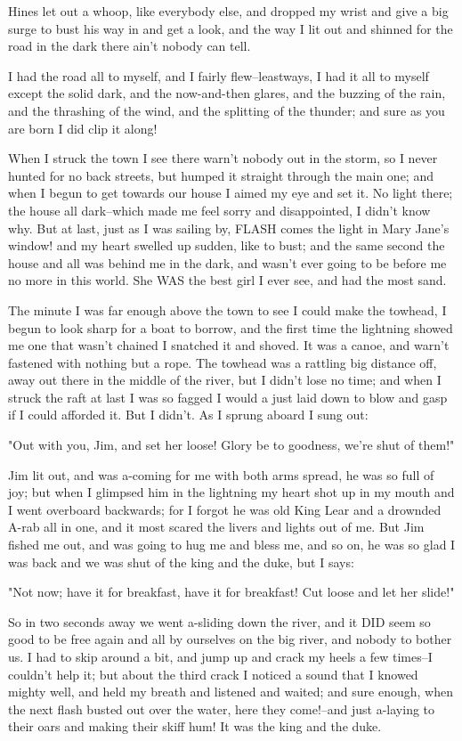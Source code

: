 Hines let out a whoop, like everybody else, and dropped my wrist and give
a big surge to bust his way in and get a look, and the way I lit out and
shinned for the road in the dark there ain't nobody can tell.

I had the road all to myself, and I fairly flew--leastways, I had it all
to myself except the solid dark, and the now-and-then glares, and the
buzzing of the rain, and the thrashing of the wind, and the splitting of
the thunder; and sure as you are born I did clip it along!

When I struck the town I see there warn't nobody out in the storm, so I
never hunted for no back streets, but humped it straight through the main
one; and when I begun to get towards our house I aimed my eye and set it.
No light there; the house all dark--which made me feel sorry and
disappointed, I didn't know why.  But at last, just as I was sailing by,
FLASH comes the light in Mary Jane's window! and my heart swelled up
sudden, like to bust; and the same second the house and all was behind me
in the dark, and wasn't ever going to be before me no more in this world.
She WAS the best girl I ever see, and had the most sand.

The minute I was far enough above the town to see I could make the
towhead, I begun to look sharp for a boat to borrow, and the first time
the lightning showed me one that wasn't chained I snatched it and shoved.
It was a canoe, and warn't fastened with nothing but a rope.  The towhead
was a rattling big distance off, away out there in the middle of the
river, but I didn't lose no time; and when I struck the raft at last I
was so fagged I would a just laid down to blow and gasp if I could
afforded it.  But I didn't.  As I sprung aboard I sung out:

"Out with you, Jim, and set her loose!  Glory be to goodness, we're shut
of them!"

Jim lit out, and was a-coming for me with both arms spread, he was so
full of joy; but when I glimpsed him in the lightning my heart shot up in
my mouth and I went overboard backwards; for I forgot he was old King
Lear and a drownded A-rab all in one, and it most scared the livers and
lights out of me.  But Jim fished me out, and was going to hug me and
bless me, and so on, he was so glad I was back and we was shut of the
king and the duke, but I says:

"Not now; have it for breakfast, have it for breakfast!  Cut loose and
let her slide!"

So in two seconds away we went a-sliding down the river, and it DID seem
so good to be free again and all by ourselves on the big river, and
nobody to bother us.  I had to skip around a bit, and jump up and crack
my heels a few times--I couldn't help it; but about the third crack I
noticed a sound that I knowed mighty well, and held my breath and
listened and waited; and sure enough, when the next flash busted out over
the water, here they come!--and just a-laying to their oars and making
their skiff hum!  It was the king and the duke.

